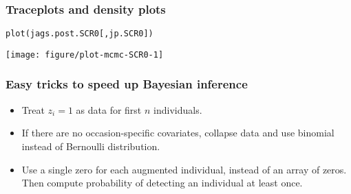 \documentclass[color=usenames,dvipsnames]{beamer}\usepackage[]{graphicx}\usepackage[]{xcolor}
\makeatletter
\newcommand{\hldef}[1]{\textcolor[rgb]{0,0,0}{#1}}%
\newcommand{\hlkwd}[1]{\textcolor[rgb]{0.004,0.004,0.506}{#1}}%
\newenvironment{kframe}{%
 \def\at@end@of@kframe{}%
 \ifinner\ifhmode%
  \def\at@end@of@kframe{\end{minipage}}%
  \begin{minipage}{\columnwidth}%
 \fi\fi%
 \def\FrameCommand##1{\hskip\@totalleftmargin \hskip-\fboxsep
 \colorbox{shadecolor}{##1}\hskip-\fboxsep
     \hskip-\linewidth \hskip-\@totalleftmargin \hskip\columnwidth}%
 \MakeFramed {\advance\hsize-\width
   \@totalleftmargin\z@ \linewidth\hsize
   \@setminipage}}%
 {\par\unskip\endMakeFramed%
 \at@end@of@kframe}
\newenvironment{knitrout}{}{} %
\makeatother
\begin{document}
\begin{frame}[fragile]
  \frametitle{Traceplots and density plots}
\begin{knitrout}\footnotesize
{}\color{fgcolor}\begin{kframe}
\begin{alltt}
\hlkwd{plot}\hldef{(jags.post.SCR0[,jp.SCR0])}
\end{alltt}
\end{kframe}

{\centering \texttt{[image: figure/plot-mcmc-SCR0-1]} 

}


\end{knitrout}
\end{frame}


\begin{frame}
  \frametitle{Easy tricks to speed up Bayesian inference}
  \begin{itemize}
    \item Treat $z_i=1$ as data for first $n$ individuals.
    \item If there are no occasion-specific covariates, collapse data
      and use binomial instead of Bernoulli distribution.
    \item Use a single zero for each augmented individual, instead of
      an array of zeros. Then compute probability of detecting an
      individual at least once.
  \end{itemize}
\end{frame}
\end{document}
